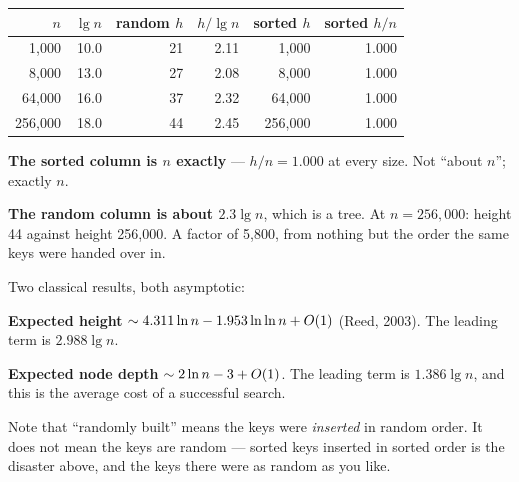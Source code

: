\begin{worked}
\begin{center}
\begin{tabular}{@{}rrrrrr@{}}
\toprule
\rowcolor{primary!15}
$n$ & $\lg n$ & random $h$ & $h/\lg n$ & sorted $h$ & sorted $h/n$ \\
\midrule
  1{,}000 & 10.0 & 21 & 2.11 &   1{,}000 & 1.000 \\
  8{,}000 & 13.0 & 27 & 2.08 &   8{,}000 & 1.000 \\
 64{,}000 & 16.0 & 37 & 2.32 &  64{,}000 & 1.000 \\
256{,}000 & 18.0 & 44 & 2.45 & 256{,}000 & 1.000 \\
\bottomrule
\end{tabular}
\end{center}

\smallskip
\textbf{The sorted column is $n$ exactly} --- $h/n = 1.000$ at every size. Not
``about $n$''; exactly $n$.

\smallskip
\textbf{The random column is about $2.3 \lg n$}, which is a tree. At
$n = 256{,}000$: height 44 against height 256{,}000. A factor of 5{,}800, from
nothing but the order the same keys were handed over in.
\end{worked}

\begin{conceptbox}
Two classical results, both asymptotic:

\begin{tight}
  \item \textbf{Expected height} $\sim 4.311 \ln n - 1.953 \ln\ln n + O(1)$
        (Reed, 2003). The leading term is $2.988 \lg n$.
  \item \textbf{Expected node depth} $\sim 2\ln n - 3 + O(1)$. The leading
        term is $1.386 \lg n$, and this is the average cost of a successful
        search.
\end{tight}

\smallskip
Note that ``randomly built'' means the keys were \emph{inserted} in random
order. It does not mean the keys are random --- sorted keys inserted in sorted
order is the disaster above, and the keys there were as random as you like.
\end{conceptbox}

